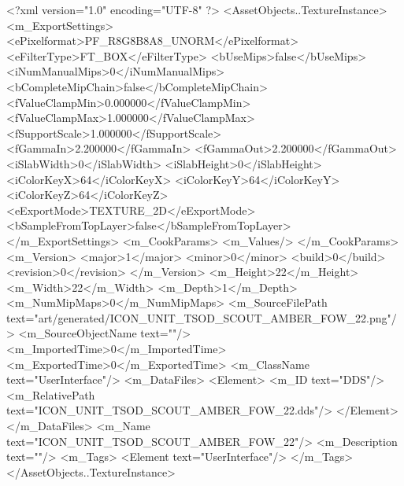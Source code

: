 <?xml version="1.0" encoding="UTF-8" ?>
<AssetObjects..TextureInstance>
	<m_ExportSettings>
		<ePixelformat>PF_R8G8B8A8_UNORM</ePixelformat>
		<eFilterType>FT_BOX</eFilterType>
		<bUseMips>false</bUseMips>
		<iNumManualMips>0</iNumManualMips>
		<bCompleteMipChain>false</bCompleteMipChain>
		<fValueClampMin>0.000000</fValueClampMin>
		<fValueClampMax>1.000000</fValueClampMax>
		<fSupportScale>1.000000</fSupportScale>
		<fGammaIn>2.200000</fGammaIn>
		<fGammaOut>2.200000</fGammaOut>
		<iSlabWidth>0</iSlabWidth>
		<iSlabHeight>0</iSlabHeight>
		<iColorKeyX>64</iColorKeyX>
		<iColorKeyY>64</iColorKeyY>
		<iColorKeyZ>64</iColorKeyZ>
		<eExportMode>TEXTURE_2D</eExportMode>
		<bSampleFromTopLayer>false</bSampleFromTopLayer>
	</m_ExportSettings>
	<m_CookParams>
		<m_Values/>
	</m_CookParams>
	<m_Version>
		<major>1</major>
		<minor>0</minor>
		<build>0</build>
		<revision>0</revision>
	</m_Version>
	<m_Height>22</m_Height>
	<m_Width>22</m_Width>
	<m_Depth>1</m_Depth>
	<m_NumMipMaps>0</m_NumMipMaps>
	<m_SourceFilePath text="art/generated/ICON_UNIT_TSOD_SCOUT_AMBER_FOW_22.png"/>
	<m_SourceObjectName text=""/>
	<m_ImportedTime>0</m_ImportedTime>
	<m_ExportedTime>0</m_ExportedTime>
	<m_ClassName text="UserInterface"/>
	<m_DataFiles>
		<Element>
			<m_ID text="DDS"/>
			<m_RelativePath text="ICON_UNIT_TSOD_SCOUT_AMBER_FOW_22.dds"/>
		</Element>
	</m_DataFiles>
	<m_Name text="ICON_UNIT_TSOD_SCOUT_AMBER_FOW_22"/>
	<m_Description text=""/>
	<m_Tags>
		<Element text="UserInterface"/>
	</m_Tags>
</AssetObjects..TextureInstance>
